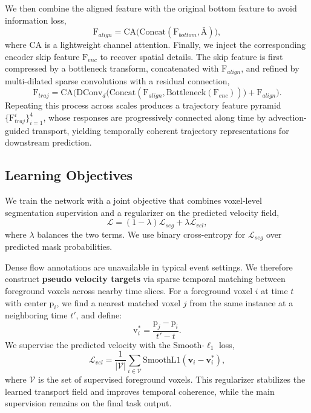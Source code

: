 \documentclass[runningheads]{llncs}
\begin{document}
We then combine the aligned feature with the original bottom feature to avoid information loss,
\begin{equation}
\mathrm{F}_{align}=\mathrm{CA}\Big(\mathrm{Concat}(\mathrm{F}_{bottom},\bar{\mathrm{A}})\Big),
\end{equation}
where $\mathrm{CA}$ is a lightweight channel attention.
Finally, we inject the corresponding encoder skip feature $\mathrm{F}_{enc}$ to recover spatial details. 
The skip feature is first compressed by a bottleneck transform, concatenated with $\mathrm{F}_{align}$, and refined by multi-dilated sparse convolutions with a residual connection,
\begin{equation}
\mathrm{F}_{traj}
=\mathrm{CA}\Big(
\mathrm{DConv}_{d}\big(\mathrm{Concat}(\mathrm{F}_{align},\mathrm{Bottleneck}(\mathrm{F}_{enc}))\big)
+\mathrm{F}_{align}
\Big).
\end{equation}
Repeating this process across scales produces a trajectory feature pyramid $\{\mathrm{F}^{i}_{traj}\}_{i=1}^{4}$, whose responses are progressively connected along time by advection-guided transport, yielding temporally coherent trajectory representations for downstream prediction.

\subsection{Learning Objectives}
\label{sec:objectives}
We train the network with a joint objective that combines voxel-level segmentation supervision and a regularizer on the predicted velocity field,
\begin{equation}
\mathcal{L}=(1-\lambda)\mathcal{L}_{seg}+\lambda\mathcal{L}_{vel},
\end{equation}
where $\lambda$ balances the two terms.
We use binary cross-entropy for $\mathcal{L}_{seg}$ over predicted mask probabilities.

Dense flow annotations are unavailable in typical event settings.
We therefore construct \textbf{pseudo velocity targets} via sparse temporal matching between foreground voxels across nearby time slices.
For a foreground voxel $i$ at time $t$ with center $\mathrm{p}_{i}$, we find a nearest matched voxel $j$ from the same instance at a neighboring time $t'$, and define:
\begin{equation}
\mathrm{v}^{*}_{i}=\frac{\mathrm{p}_{j}-\mathrm{p}_{i}}{t'-t}.
\end{equation}
We supervise the predicted velocity with the Smooth-$\ell_{1}$ loss,
\begin{equation}
\mathcal{L}_{vel}=
\frac{1}{|\mathcal{V}|}\sum_{i\in\mathcal{V}}
\mathrm{SmoothL1}\left(\mathbf{v}_{i}-\mathbf{v}^{*}_{i}\right),
\end{equation}
where $\mathcal{V}$ is the set of supervised foreground voxels.
This regularizer stabilizes the learned transport field and improves temporal coherence, while the main supervision remains on the final task output.
\end{document}
